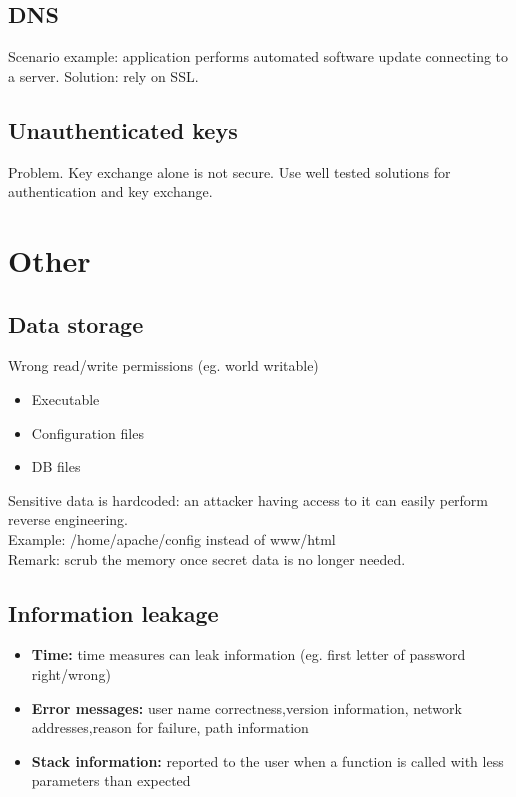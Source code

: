 \documentclass[10pt,a4paper]{book}
\begin{document}
\section{DNS}
Scenario example: application performs automated software update connecting to a server. Solution: rely on SSL.
\section{Unauthenticated keys}
Problem. Key exchange alone is not secure. Use well tested solutions for authentication and key exchange.
\chapter{Other}
\section{Data storage}
Wrong read/write permissions (eg. world writable)
\begin{itemize}
\item Executable
\item Configuration files
\item DB files
\end{itemize}
Sensitive data is hardcoded: an attacker having access to it can easily perform reverse engineering.\\
Example: /home/apache/config instead of www/html\\
Remark: scrub the memory once secret data is no longer needed.
\section{Information leakage}
\begin{itemize}
\item \textbf{Time:} time measures can leak information (eg. first letter of password right/wrong)
\item \textbf{Error messages:} user name correctness,version information, network addresses,reason for failure, path information
\item \textbf{Stack information:} reported to the user when a function is called with less parameters than expected
\end{itemize}
\end{document}
